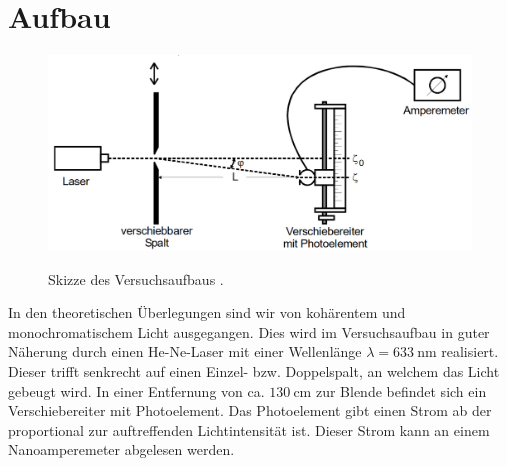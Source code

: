 \section{Aufbau}
\label{sec:Aufbau}
\begin{figure}
	\centering
	\caption{Skizze des Versuchsaufbaus \cite{V406}.}
	\includegraphics[width=\linewidth-150pt,height=\textheight-150pt,keepaspectratio]{content/images/Aufbau.png}
	\label{fig:Aufbau}
\end{figure}
In den theoretischen Überlegungen sind wir von kohärentem und monochromatischem Licht ausgegangen. Dies wird im Versuchsaufbau in guter Näherung durch einen He-Ne-Laser mit einer Wellenlänge $\lambda = \SI{633}{\nano\meter}$ realisiert. Dieser trifft senkrecht auf einen Einzel- bzw. Doppelspalt, an welchem das Licht gebeugt wird. In einer Entfernung von ca. $\SI{130}{\centi\meter}$ zur Blende befindet sich ein Verschiebereiter mit Photoelement. Das Photoelement gibt einen Strom ab der proportional zur auftreffenden Lichtintensität ist. Dieser Strom kann an einem Nanoamperemeter abgelesen werden.